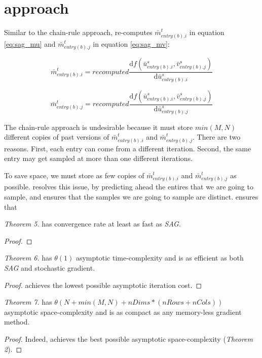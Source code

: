 \section{approach}
Similar to the chain-rule approach, \tool re-computes $\bar{m}_{entry(b).i}^{t}$ in equation \ref{eq:sag_mu} and $\bar{m}_{entry(b).j}^{t}$ in equation \ref{eq:sag_mv}:

\begin{equation} \label{eq:sagre_mu}
  \bar{m}_{entry(b).i}^{t} = recomputed  \frac{\text{d}f(\bar{u}_{entry(b).i}^{s}, \bar{v}_{entry(b).j}^{s})}{\text{d}\bar{u}_{entry(b).i}^{s}}
\end{equation}

\begin{equation} \label{eq:sagre_mu}
  \bar{m}_{entry(b).j}^{t} = recomputed  \frac{\text{d}f(\bar{u}_{entry(b).i}^{s}, \bar{v}_{entry(b).j}^{s})}{\text{d}\bar{u}_{entry(b).j}^{s}}
\end{equation}

The chain-rule approach is undesirable because it must store $min(M,N)$ different copies of past versions of $\bar{m}_{entry(b).i}^{t}$ and $\bar{m}_{entry(b).j}^{t}$.
There are two reasons.  First, each entry can come from a different iteration.  Second, the same entry may get sampled at more than one different iterations.

To save space, we must store as few copies of $\bar{m}_{entry(b).i}^{t}$ and $\bar{m}_{entry(b).j}^{t}$ as possible.  
\tool resolves this issue, by predicting ahead the entires that we are going to sample, and ensures that the samples we are going to sample are distinct.  
\tool ensures that 


\emph{Theorem 5.}
\tool has convergence rate at least as fast as \emph{SAG}.
\begin{proof}

\end{proof}


\emph{Theorem 6.}
\tool has $\theta(1)$ asymptotic time-complexity and is as efficient as both \emph{SAG} and stochastic gradient.
\begin{proof}
\tool achieves the lowest possible asymptotic iteration cost.
\end{proof}


\emph{Theorem 7.}
\tool has $\theta(N + min(M,N) + nDims*(nRows+nCols))$ asymptotic space-complexity and is as compact as any memory-less gradient method.
\begin{proof}
Indeed, \tool achieves the best possible asymptotic space-complexity (\emph{Theorem 2}).
\end{proof}
